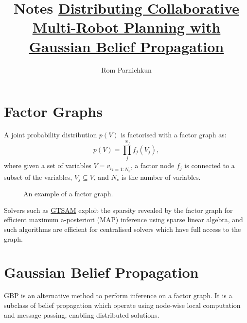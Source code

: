 \documentclass[twocolumn]{article}
\begin{document}
\title{Notes \href{https://arxiv.org/pdf/2203.11618.pdf}{Distributing Collaborative Multi-Robot Planning with Gaussian Belief Propagation}}
\author{Rom Parnichkun}

\maketitle

\section{Factor Graphs}

A joint probability distribution $p(V)$ is factorised with a factor graph as:
\begin{equation}
    p(V) = \prod_{j}^{N_f}{f_j(V_j)},
\end{equation}
where given a set of variables $V = {v_i}_{i=1:N_v}$, a factor node $f_j$ is connected to a subset of the variables, $V_j \subseteq V$, and $N_v$ is the number of variables.

\begin{figure}[h]
\centering
{}
\caption{An example of a factor graph.}
\end{figure}

Solvers such as \href{https://gtsam.org/get_started/}{GTSAM} exploit the sparsity revealed by the factor graph for efficient maximum a-posteriori (MAP) inference using sparse linear algebra, and such algorithms are efficient for centralised solvers which have full access to the graph.

\section{Gaussian Belief Propagation}

GBP is an alternative method to perform inference on a factor graph. It is a subclass of belief propagation which operate using node-wise local computation and message passing, enabling distributed solutions.
\end{document}
